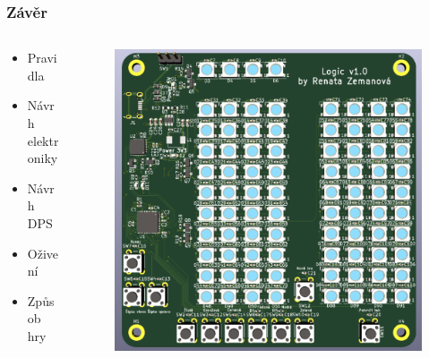\documentclass[%
  12pt,       				%
	t,                  %
	aspectratio=1610,   %
	unicode,						%
]{beamer}				    	%
\begin{document}
\begin{frame} 
	\frametitle{Závěr}
	\begin{columns}[T] %
		\begin{column}{0.3\textwidth}		%
			\vspace{0.5cm}
			\begin{itemize}
				\item Pravidla
				\item Návrh elektroniky
				\item Návrh DPS
				\item Oživení
				\item Způsob hry
			\end{itemize}
		\end{column}
		\begin{column}{0.7\textwidth}		%
			\begin{figure}%
				\centering
				\includegraphics[width=0.7\columnwidth]{obrazky/Verze1_3D_pohled.png}
			\end{figure}
		\end{column}
	\end{columns}	
\end{frame}
\end{document}
